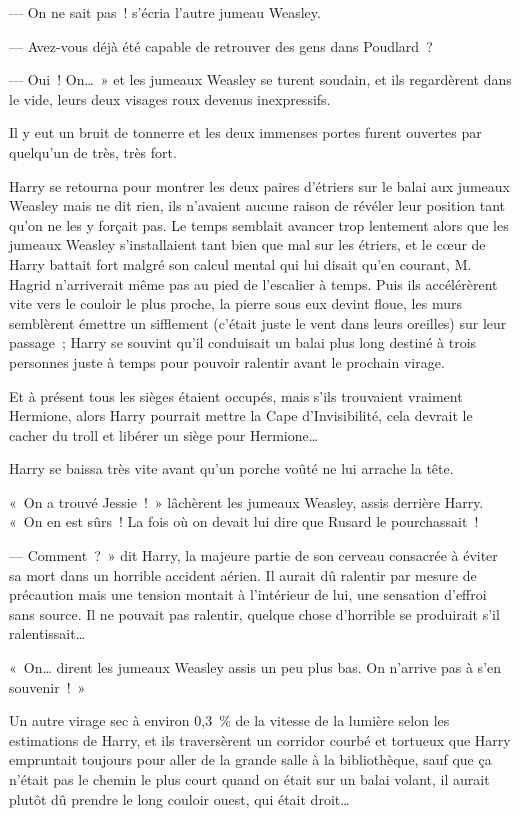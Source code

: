 --- On ne sait pas~! s'écria l'autre jumeau Weasley.

--- Avez-vous déjà été capable de retrouver des gens dans Poudlard~?

--- Oui~! On…~» et les jumeaux Weasley se turent soudain, et ils regardèrent dans le vide, leurs deux visages roux devenus inexpressifs.

Il y eut un bruit de tonnerre et les deux immenses portes furent ouvertes par quelqu'un de très, très fort.

Harry se retourna pour montrer les deux paires d'étriers sur le balai aux jumeaux Weasley mais ne dit rien, ils n'avaient aucune raison de révéler leur position tant qu'on ne les y forçait pas. Le temps semblait avancer trop lentement alors que les jumeaux Weasley s'installaient tant bien que mal sur les étriers, et le cœur de Harry battait fort malgré son calcul mental qui lui disait qu'en courant, M. Hagrid n'arriverait même pas au pied de l'escalier à temps. Puis ils accélérèrent vite vers le couloir le plus proche, la pierre sous eux devint floue, les murs semblèrent émettre un sifflement (c'était juste le vent dans leurs oreilles) sur leur passage~; Harry se souvint qu'il conduisait un balai plus long destiné à trois personnes juste à temps pour pouvoir ralentir avant le prochain virage.

Et à présent tous les sièges étaient occupés, mais s'ils trouvaient vraiment Hermione, alors Harry pourrait mettre la Cape d'Invisibilité, cela devrait le cacher du troll et libérer un siège pour Hermione…

Harry se baissa très vite avant qu'un porche voûté ne lui arrache la tête.

«~On a trouvé Jessie~!~» lâchèrent les jumeaux Weasley, assis derrière Harry. «~On en est sûrs~! La fois où on devait lui dire que Rusard le pourchassait~!

--- Comment~?~» dit Harry, la majeure partie de son cerveau consacrée à éviter sa mort dans un horrible accident aérien. Il aurait dû ralentir par mesure de précaution mais une tension montait à l'intérieur de lui, une sensation d'effroi sans source. Il ne pouvait pas ralentir, quelque chose d'horrible se produirait s'il ralentissait…

«~On… dirent les jumeaux Weasley assis un peu plus bas. On n'arrive pas à s'en souvenir~!~»

Un autre virage sec à environ 0,3~\% de la vitesse de la lumière selon les estimations de Harry, et ils traversèrent un corridor courbé et tortueux que Harry empruntait toujours pour aller de la grande salle à la bibliothèque, sauf que ça n'était pas le chemin le plus court quand on était sur un balai volant, il aurait plutôt dû prendre le long couloir ouest, qui était droit…

